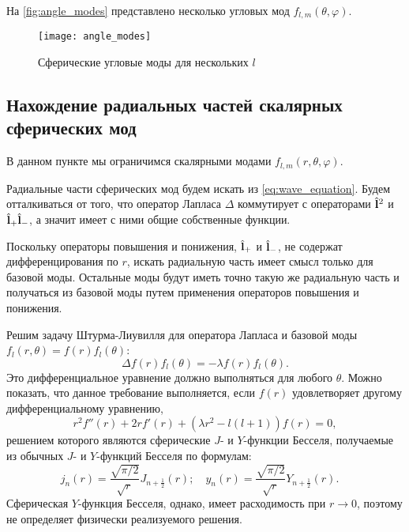 \documentclass[12pt,a4paper]{article}
\begin{document}
            На \autoref{fig:angle_modes} представлено несколько угловых мод $f_{l,m}(\theta,\varphi)$.
            \begin{figure}[h]
                \centering
                \texttt{[image: angle\_modes]}
                \caption[]{Сферические угловые моды для нескольких $l$}
                \label{fig:angle_modes}
            \end{figure}


        \subsection{Нахождение радиальных частей скалярных сферических мод}

            В данном пункте мы ограничимся скалярными модами $f_{l,m}(r,\theta,\varphi)$.

            Радиальные части сферических мод будем искать из \autoref{eq:wave_equation}. Будем отталкиваться от того, что оператор Лапласа $\Delta$ коммутирует с операторами $\hat{\mathbf{l}}^2$ и $\hat{\mathbf{l}}_{+} \hat{\mathbf{l}}_{-}$, а значит имеет с ними общие собственные функции.

            Поскольку операторы повышения и понижения, $\hat{\mathbf{l}}_{+}$ и $\hat{\mathbf{l}}_{-}$, не содержат дифференцирования по $r$, искать радиальную часть имеет смысл только для базовой моды. Остальные моды будут иметь точно такую же радиальную часть и получаться из базовой моды путем применения операторов повышения и понижения.

            Решим задачу Штурма-Лиувилля для оператора Лапласа и базовой моды $f_{l}(r,\theta) = f(r) f_{l}(\theta)$:
            \begin{equation}
                \Delta f(r) f_{l}(\theta) = - \lambda f(r) f_{l}(\theta) .
            \end{equation}
            Это дифференциальное уравнение должно выполняться для любого $\theta$. Можно показать, что данное требование выполняется, если $f(r)$ удовлетворяет другому дифференциальному уравнению,
            \begin{equation}
                r^2 f''(r) + 2 r f'(r) + (\lambda r^2 - l(l+1)) f(r) = 0 ,
            \end{equation}
            решением которого являются сферические $J$- и $Y$-функции Бесселя, получаемые из обычных $J$- и $Y$-функций Бесселя по формулам:
            \begin{equation}
                j_n(r) = \frac{\sqrt{\pi/2}}{\sqrt{r}} J_{n+\frac{1}{2}}(r) ; \quad
                y_n(r) = \frac{\sqrt{\pi/2}}{\sqrt{r}} Y_{n+\frac{1}{2}}(r) . \quad
            \end{equation}
            Сферическая $Y$-функция Бесселя, однако, имеет расходимость при $r \to 0$, поэтому не определяет физически реализуемого решения.
\end{document}
